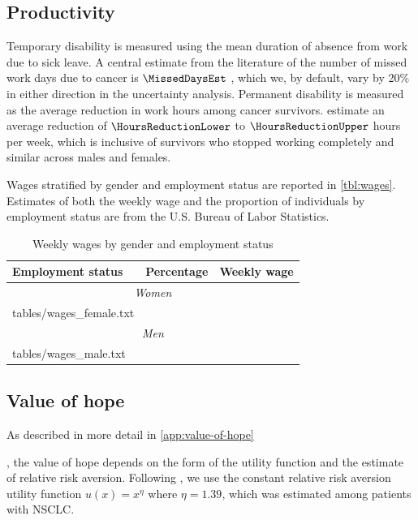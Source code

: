 \documentclass[11pt,final,fleqn]{article}\usepackage[]{graphicx}\usepackage[]{color}
\makeatletter
\theoremstyle{plain}
\newcommand*\ExpandableInput[1]{\@@input#1 }
\makeatother
\begin{document}
{\subsection{Productivity}\label{subsec:data-productivity}
Temporary disability is measured using the mean duration of absence from work due to sick leave. A central estimate from the literature of the number of missed work days due to cancer is $\MissedDaysEst$ \citep{mehnert2011employment}, which we, by default, vary by 20\% in either direction in the uncertainty analysis. Permanent disability is measured as the average reduction in work hours among cancer survivors. \citet{short2008long} estimate an average reduction of $\HoursReductionLower$ to $\HoursReductionUpper$ hours per week, which is inclusive of survivors who stopped working completely and similar across males and females.

Wages stratified by gender and employment status are reported in \autoref{tbl:wages}. Estimates of both the weekly wage and the proportion of individuals by employment status are from the U.S. Bureau of Labor Statistics.

\begin{table}[!ht]
\begin{center}
\begin{threeparttable}
\caption{Weekly wages by gender and employment status} \label{tbl:wages}
\begin{tabularx}{\textwidth}{@{\extracolsep{\fill}}lrr}
\hline
 \multicolumn{1}{l}{Employment status} & \multicolumn{1}{l}{Percentage} &  \multicolumn{1}{l}{Weekly wage} \\
\hline
 \multicolumn{3}{c}{\textit{Women}}\\
\ExpandableInput{tables/wages_female.txt} \\
 \multicolumn{3}{c}{\textit{Men}}\\
\ExpandableInput{tables/wages_male.txt}
\hline
\end{tabularx}
\scriptsize
\end{threeparttable}
\end{center}
\end{table}


\subsection{Value of hope}\label{subsec:data-voh}
As described in more detail in \autoref{app:value-of-hope}}, the value of hope depends on the form of the utility function and the estimate of relative risk aversion. Following \citet{shafrin2017patient}, we use the constant relative risk aversion utility function $u(x) = x^\eta$ where $\eta = 1.39$, which was estimated among patients with NSCLC. 
\end{document}
